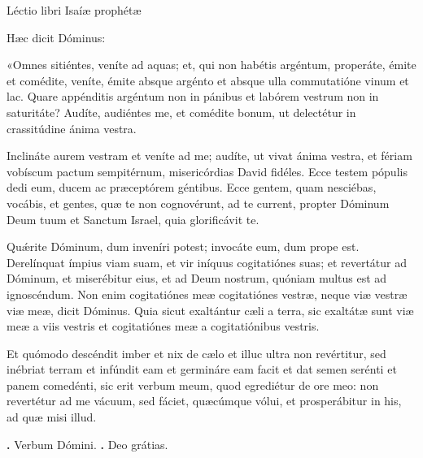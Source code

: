 
Léctio libri Isaíæ prophétæ

Hæc dicit Dóminus: 

«Omnes sitiéntes, veníte ad aquas; et, qui non habétis argéntum, properáte, émite et comédite, veníte, émite absque argénto et absque ulla commutatióne vinum et lac.
Quare appénditis argéntum non in pánibus et labórem vestrum non in saturitáte? Audíte, audiéntes me, et comédite bonum, ut delectétur in crassitúdine ánima vestra.

Inclináte aurem vestram et veníte ad me; audíte, ut vivat ánima vestra, et fériam vobíscum pactum sempitérnum, misericórdias David fidéles.
Ecce testem pópulis dedi eum, ducem ac præceptórem géntibus.
Ecce gentem, quam nesciébas, vocábis, et gentes, quæ te non cognovérunt, ad te current, propter Dóminum Deum tuum et Sanctum Israel, quia glorificávit te.

Qu\'{\ae}rite Dóminum, dum inveníri potest; invocáte eum, dum prope est.
Derelínquat ímpius viam suam, et vir iníquus cogitatiónes suas; et revertátur ad Dóminum, et miserébitur eius, et ad Deum nostrum, quóniam multus est ad ignoscéndum.
Non enim cogitatiónes meæ cogitatiónes vestræ, neque viæ vestræ viæ meæ, dicit Dóminus.
Quia sicut exaltántur cæli a terra, sic exaltátæ sunt viæ meæ a viis vestris et cogitatiónes meæ a cogitatiónibus vestris.

Et quómodo descéndit imber et nix de cælo et illuc ultra non revértitur, sed inébriat terram et infúndit eam et germináre eam facit et dat semen serénti et panem comedénti, sic erit verbum meum, quod egrediétur de ore meo: non revertétur ad me vácuum, sed fáciet, quæcúmque vólui, et prosperábitur in his, ad quæ misi illud.

\textbf{\Vbar.} Verbum Dómini.
\textbf{\Rbar.} Deo grátias.
\par